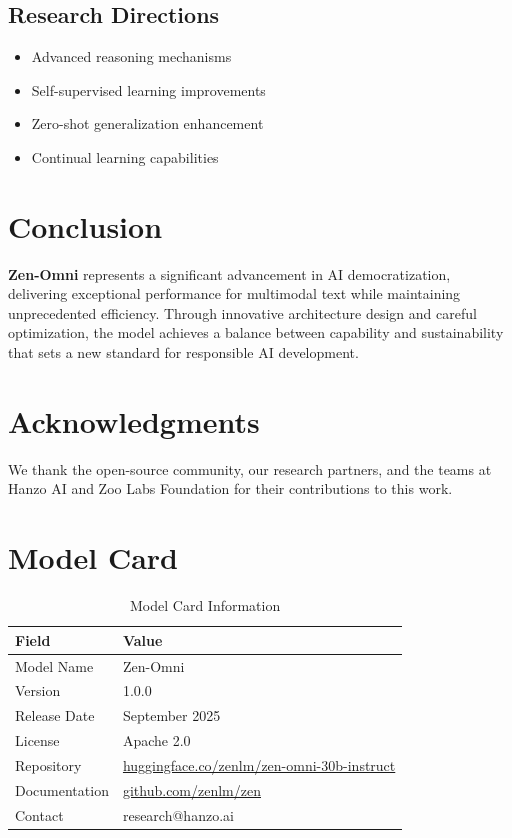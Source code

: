 \documentclass[11pt,a4paper]{article}
\begin{document}
\subsection{Research Directions}
\begin{itemize}
    \item Advanced reasoning mechanisms
    \item Self-supervised learning improvements
    \item Zero-shot generalization enhancement
    \item Continual learning capabilities
\end{itemize}

\section{Conclusion}

\textbf{Zen-Omni} represents a significant advancement in AI democratization, 
delivering exceptional performance for multimodal text while maintaining 
unprecedented efficiency. Through innovative architecture design and careful optimization, 
the model achieves a balance between capability and sustainability that sets a new standard 
for responsible AI development.

\section*{Acknowledgments}

We thank the open-source community, our research partners, and the teams at Hanzo AI and 
Zoo Labs Foundation for their contributions to this work.

\appendix

\section{Model Card}

\begin{table}[H]
\centering
\begin{tabular}{ll}
\toprule
\textbf{Field} & \textbf{Value} \\
\midrule
Model Name & Zen-Omni \\
Version & 1.0.0 \\
Release Date & September 2025 \\
License & Apache 2.0 \\
Repository & \href{https://huggingface.co/zenlm/zen-omni-30b-instruct}{huggingface.co/zenlm/zen-omni-30b-instruct} \\
Documentation & \href{https://github.com/zenlm/zen}{github.com/zenlm/zen} \\
Contact & research@hanzo.ai \\
\bottomrule
\end{tabular}
\caption{Model Card Information}
\end{table}
\end{document}
